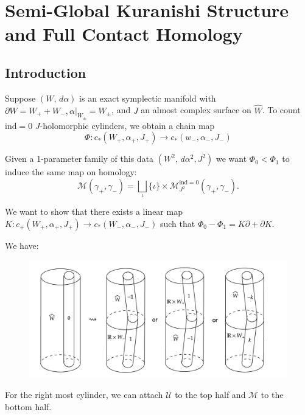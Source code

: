 \chapter{Semi-Global Kuranishi Structure and Full Contact Homology}
\label{b3}

\section{Introduction}
Suppose $(W,\,d\alpha)$ is an exact symplectic manifold with $\partial W=W_+ + W_-, \alpha|_{W_\pm}=W_{\pm}$, and $J$ an almost complex surface on $\hat{W}$. To count $\text{ind}=0$ $J$-holomorphic cylinders, we obtain a chain map
\[
\Phi: c_*(W_+, \alpha_+, J_+) \to c_*(w_-, \alpha_-, J_-)
\]

Given a 1-parameter family of this data $(W^2, \,d\alpha^2, J^2)$ we want $ \Phi_0 < \Phi_1$ to induce the same map on homology:
\[
\mathcal{M}(\gamma_+, \gamma_-) = \bigsqcup_\iota \{ \iota \}\times \mathcal{M}_{J^2}^{\text{ind}=0} (\gamma_+, \gamma_-).
\]

We want to show that there exists a linear map $K: c_+(W_+, \alpha_+, J_+) \to c_*(W_-, \alpha_-, J_-)$ such that $\Phi_0-\Phi_1 = K\partial + \partial K$.

We have:
\newpage
\vspace{-20pt}
\begin{center}
    \begin{figure}[htbp]
  \centering
  \includegraphics[width=1\textwidth]{images/bao2.png}
  \label{fig:bi14}
\end{figure}
\end{center}
\vspace{-50pt}
For the right most cylinder, we can attach $\mathcal{U}$ to the top half and $\mathcal{M}$ to the bottom half.

